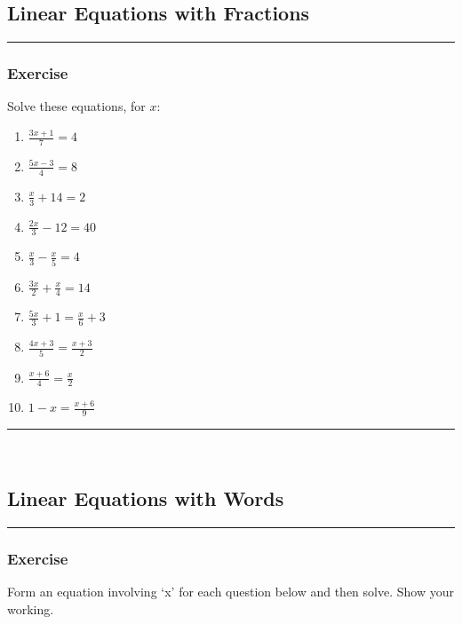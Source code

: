\documentclass[a4paper,12pt]{article}
\newcommand\question{
	 \rule[0pt]{17cm}{0.5pt}\vspace{-0.5cm}
	\subsubsection{Exercise}

}
\newcommand\questionend{
	\rule[0pt]{17cm}{0.5pt}\vspace{0.0cm}\\
}
\begin{document}
\newpage
\subsection{Linear Equations with Fractions}
\question
Solve these equations, for $x$:
\begin{multicols}{2}
	\begin{enumerate}[label=\normalsize \alph*)~~~]
\item $\displaystyle \frac{3x+1}{7} = 4$
\item $\displaystyle  \frac{5x - 3}{4} = 8$
\item $\displaystyle  \frac{x}{3} + 14 = 2$
\item $\displaystyle \frac{2x}{3} - 12 = 40$
\item $\displaystyle \frac{x}{3} - \frac{x}{5} = 4$
\item $\displaystyle \frac{3x}{2} + \frac{x}{4} = 14$
\item $\displaystyle \frac{5x}{3} + 1 = \frac{x}{6} + 3$
\item $\displaystyle \frac{4x+3}{5} = \frac{x+3}{2}$
\item $\displaystyle \frac{x+6}{4} = \frac{x}{2}$
\item $\displaystyle 1 - x = \frac{x+6}{9}$
\end{enumerate}
\end{multicols}
\questionend\vspace{-1cm}
\newpage
\subsection{Linear Equations with Words}
\question
Form an equation involving ‘x’ for each question below and then solve. Show your working.
\end{document}
